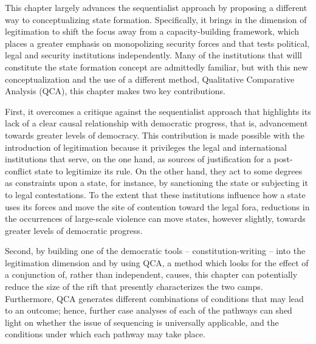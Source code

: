 \documentclass [11pt]{article}
\begin{document}
This chapter largely advances the sequentialist approach by proposing a different way to conceptualizing state formation. Specifically, it brings in the dimension of legitimation to shift the focus away from a capacity-building framework, which places a greater emphasis on monopolizing security forces and that tests political, legal and security institutions independently. Many of the institutions that willl constitute the state formation concept are admittedly familiar, but with this new conceptualization and the use of a different method, Qualitative Comparative Analysis (QCA), this chapter makes two key contributions.

First, it overcomes a critique against the sequentialist approach that highlights its lack of a clear causal relationship with democratic progress, that is, advancement towards greater levels of democracy. This contribution is made possible with the introduction of legitimation because it privileges the legal and international institutions that serve, on the one hand, as sources of justification for a post-conflict state to legitimize its rule. On the other hand, they act to some degrees as constraints upon a state, for instance, by sanctioning the state or subjecting it to legal contestations. To the extent that these institutions influence how a state uses its forces and move the site of contention toward the legal fora, reductions in the occurrences of large-scale violence can move states, however slightly, towards greater levels of democratic progress.

Second, by building one of the democratic tools -- constitution-writing -- into the legitimation dimension and by using QCA, a method which looks for the effect of a conjunction of, rather than independent, causes, this chapter can potentially reduce the size of the rift that presently characterizes the two camps. Furthermore, QCA generates different combinations of conditions that may lead to an outcome; hence, further case analyses of each of the pathways can shed light on whether the issue of sequencing is universally applicable, and the conditions under which each pathway may take place.
\end{document}
